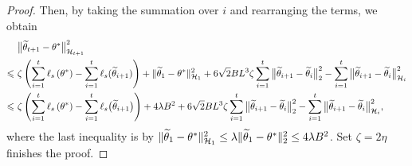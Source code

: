 \begin{proof}
    Then, by taking the summation over $i$ and rearranging the terms, we obtain
    \begin{align*}
        & \big\|\widetilde{\theta}_{t+1}-\theta^*\big\|_{\mathcal{H}_{t+1}}^2 \\
        \leqslant \ & \zeta\left(\sum_{i=1}^t \ell_{s}\left(\theta^*\right)-\sum_{i=1}^t \ell_{s}(\widetilde{\theta}_{i+1})\right)+\|\widetilde{\theta}_{1}-\theta^*\|_{\mathcal{H}_{1}}^2 +6\sqrt{2} BL^3 \zeta \sum_{i=1}^t\big\|\widetilde{\theta}_{i+1}-\widetilde{\theta}_i\big\|_2^2 -\sum_{i=1}^t\big\|\widetilde{\theta}_{i+1}-\widetilde{\theta}_i\big\|_{\mathcal{H}_i}^2 \\
        \leqslant \ & \zeta\left(\sum_{i=1}^t \ell_{s}\left(\theta^*\right)-\sum_{i=1}^t \ell_{s}\big(\widetilde{\theta}_{i+1}\big)\right)+4 \lambda B^2  +6\sqrt{2}BL^3 \zeta \sum_{i=1}^t\big\|\widetilde{\theta}_{i+1}-\widetilde{\theta}_i\big\|_2^2 -\sum_{i=1}^t\big\|\widetilde{\theta}_{i+1}-\widetilde{\theta}_i\big\|_{\mathcal{H}_i}^2,
    \end{align*}
    where the last inequality is by $\|\widetilde{\theta}_{1}-\theta^*\|_{\mathcal{H}_{1}}^2 \leq \lambda \|\widetilde{\theta}_{1}-\theta^*\|_2^2 \leq 4 \lambda B^2$. Set $\zeta = 2\eta$ finishes the proof. 
\end{proof}

